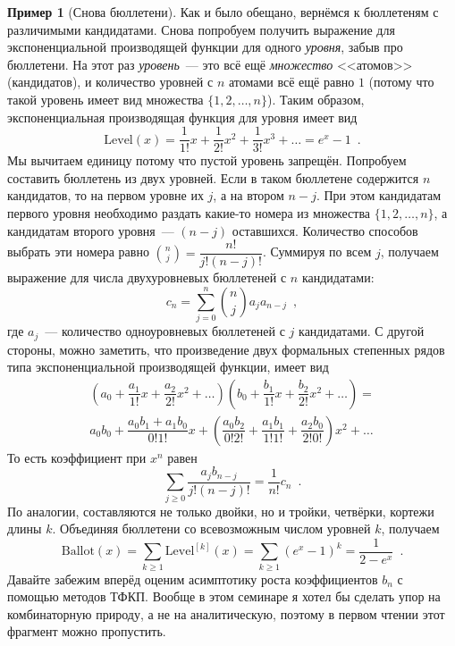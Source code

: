\documentclass[a5paper]{article}
\theoremstyle{definition}
\newtheorem{example}{Пример}
\begin{document}
\begin{example}[Снова бюллетени]
Как и было обещано, вернёмся к бюллетеням с различимыми кандидатами. Снова 
попробуем получить выражение для экспоненциальной производящей функции для 
одного \textit{уровня}, забыв про бюллетени. На этот 
раз \textit{уровень}~--- это всё ещё \textit{множество} <<атомов>> 
(кандидатов), и количество уровней с \( n \) атомами всё ещё равно \( 1 \) 
(потому что такой уровень имеет вид множества \( \{1, 2, \ldots, n\} \)). Таким 
образом, экспоненциальная производящая функция для уровня имеет вид
\[
	\mathrm{Level} (x) = \dfrac{1}{1!} x + \dfrac{1}{2!} x^2 + \dfrac{1}{3!}x^3 
	+ \ldots = e^x - 1
	\enspace .
\]
Мы вычитаем единицу потому что пустой уровень запрещён.
Попробуем составить бюллетень из двух уровней. Если в таком бюллетене 
содержится \( n \) кандидатов, то на первом уровне их \( j \), а на втором \( 
n-j \). При этом кандидатам первого уровня необходимо раздать какие-то номера 
из множества \( \{1, 2, \ldots, n\} \), а кандидатам второго уровня~--- \( 
(n-j) \) оставшихся. Количество способов выбрать эти номера равно \( {n \choose 
j} = \dfrac{n!}{j! (n-j)!} \). Суммируя по всем \( j \), получаем выражение для 
числа двухуровневых бюллетеней с \( n \) кандидатами:
\[
	c_n = \sum_{j=0}^{n} {n \choose j} a_j a_{n-j} \enspace ,
\]
где \( a_j \)~--- количество одноуровневых бюллетеней с \( j \) кандидатами. С 
другой стороны, можно заметить, что произведение двух формальных степенных 
рядов типа экспоненциальной производящей функции, имеет вид
\begin{multline*}
	\left( a_0 + \dfrac{a_1}{1!}x + \dfrac{a_2}{2!}x^2 + \ldots
    \right )
	\left( b_0 + \dfrac{b_1}{1!}x + \dfrac{b_2}{2!}x^2 + \ldots
    \right)
	= \\
	a_0 b_0 + \dfrac{a_0 b_1 + a_1 b_0}{0!1!} x + 
	\left(\dfrac{a_0 b_2}{0!2!} + \dfrac{a_1b_1}{1!1!} + \dfrac{a_2 
	b_0}{2!0!}\right)x^2 + \ldots
\end{multline*}
То есть коэффициент при \( x^n \) равен
\[
	\sum_{j \geq 0} \dfrac{a_j b_{n-j}}{j! (n-j)!} = \dfrac{1}{n!} c_n
	\enspace .
\]
По аналогии, составляются не только двойки, но и тройки, четвёрки, кортежи 
длины \( k \). Объединяя бюллетени со всевозможным числом уровней \( k \), 
получаем
\[
	\mathrm{Ballot}(x) = \sum_{k \geq 1} \mathrm{Level}^{[k]}(x) = \sum_{k \geq 
	1} (e^{x} - 1)^k = \dfrac{1}{2 - e^x} \enspace .
\]
Давайте забежим вперёд оценим асимптотику роста коэффициентов \( b_n \) с 
помощью методов ТФКП. Вообще в этом семинаре я хотел бы сделать упор на 
комбинаторную природу, а не на аналитическую, поэтому в первом чтении этот 
фрагмент можно пропустить.


\end{example}
\end{document}
